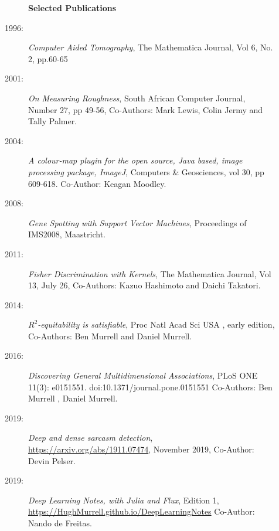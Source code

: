 \documentclass[12pt]{article}
\begin{document}
\begin{multicols}{2}
\begin{description}\item[] \begin{description}\item[] {\large \bf  Selected Publications  }
\item[1996:]
      {\it Computer Aided Tomography},
      The Mathematica Journal, Vol 6, No. 2, pp.60-65 
\item[2001:]
      {\it On Measuring Roughness}, South African Computer Journal,
      Number 27, pp 49-56, Co-Authors:
      Mark Lewis, Colin Jermy and Tally Palmer.
 \item[2004:]
      {\it A colour-map plugin for the open source, Java based,
      image processing package, ImageJ},
      Computers \& Geosciences, vol 30, pp 609-618.
      Co-Author: Keagan Moodley. 
\item[2008:]
      {\it Gene Spotting with Support Vector Machines},
      Proceedings of IMS2008,
      Maastricht. 
\item[2011:]
      {\it Fisher Discrimination with Kernels},
      The Mathematica Journal, Vol 13, July 26,
      Co-Authors: Kazuo Hashimoto and Daichi Takatori. 
\item[2014:]
         {\it $R^2$-equitability is satisfiable}, Proc Natl Acad Sci USA , early edition, 
         Co-Authors: Ben Murrell and Daniel Murrell. 
\item[2016:]
         {\it Discovering General Multidimensional Associations},
         PLoS ONE 11(3): e0151551. doi:10.1371/journal.pone.0151551
	Co-Authors: Ben Murrell , Daniel Murrell. 
\item[2019:]
         {\it Deep and dense sarcasm detection},
         \url{https://arxiv.org/abs/1911.07474}, November 2019,
         Co-Author: Devin Pelser. 
 \item[2019:]
 	{\it Deep Learning Notes, with Julia and Flux}, Edition 1,
	\url{https://HughMurrell.github.io/DeepLearningNotes}
	Co-Author: Nando de Freitas. 

\end{description}
\end{description}

\end{multicols}
\end{document}
